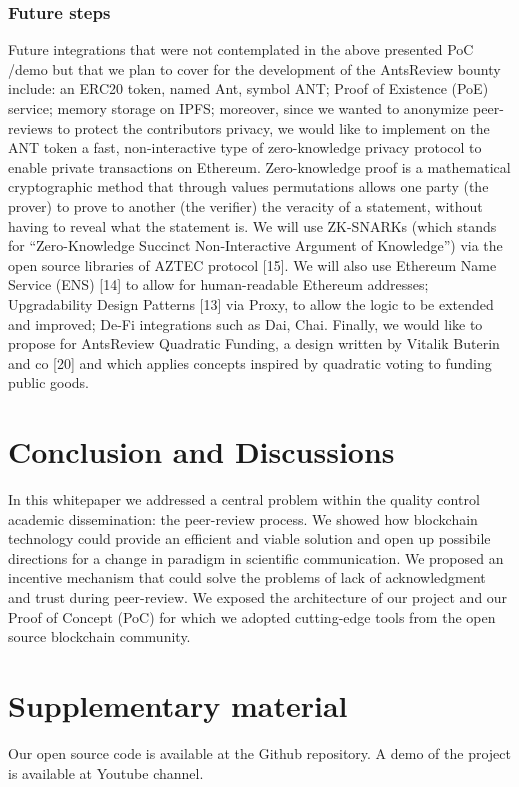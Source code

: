 \documentclass[runningheads]{llncs}
\begin{document}
\subsubsection{Future steps}
Future integrations that were not contemplated in the above presented PoC /demo but that we plan to cover for the development of the AntsReview bounty include: an ERC20 token, named Ant,  symbol ANT; Proof of Existence (PoE) service; memory storage on IPFS; moreover, since we wanted to anonymize peer-reviews to protect the contributors privacy, we would like to implement on the ANT token a fast, non-interactive type of zero-knowledge privacy protocol to enable private transactions on Ethereum. Zero-knowledge proof is a mathematical cryptographic method that through values permutations allows one party (the prover) to prove to another (the verifier) the veracity of a statement, without having to reveal what the statement is. We will use ZK-SNARKs (which stands for “Zero-Knowledge Succinct Non-Interactive Argument of Knowledge”) via the open source libraries of AZTEC protocol [15]. We will also use Ethereum Name Service (ENS) [14] to allow for human-readable Ethereum addresses; Upgradability Design Patterns [13] via Proxy, to allow the logic to be extended and improved; De-Fi integrations such as Dai, Chai. Finally, we would like to propose for AntsReview Quadratic Funding, a design written by Vitalik Buterin and co [20] and which applies concepts inspired by quadratic voting to funding public goods. 

\section{Conclusion and Discussions}
In this whitepaper we addressed a central problem within the quality control academic dissemination: the peer-review process. We showed how blockchain technology could provide an efficient and viable solution and open up possibile directions for a change in paradigm in scientific communication. We proposed an incentive mechanism that could solve the problems of lack of acknowledgment and trust during peer-review. We exposed the architecture of our project and our Proof of Concept (PoC) for which we adopted cutting-edge tools from the open source blockchain community.

\section{Supplementary material}
Our open source code is available at the Github repository. A demo of the project is available at Youtube channel.
\end{document}
